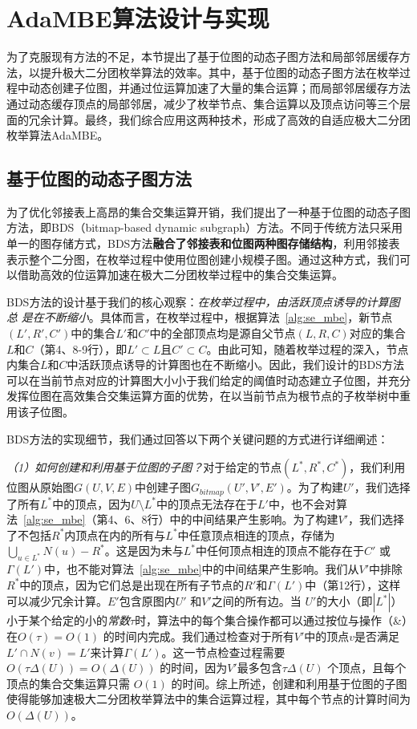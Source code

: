 \section{AdaMBE算法设计与实现}

为了克服现有方法的不足，本节提出了基于位图的动态子图方法和局部邻居缓存方法，以提升极大二分团枚举算法的效率。其中，基于位图的动态子图方法在枚举过程中动态创建子位图，并通过位运算加速了大量的集合运算；而局部邻居缓存方法通过动态缓存顶点的局部邻居，减少了枚举节点、集合运算以及顶点访问等三个层面的冗余计算。最终，我们综合应用这两种技术，形成了高效的自适应极大二分团枚举算法AdaMBE。

\subsection{基于位图的动态子图方法}
\label{subsec:ada_design_1}

为了优化邻接表上高昂的集合交集运算开销，我们提出了一种基于位图的动态子图方法，即BDS（bitmap-based dynamic subgraph）方法。不同于传统方法只采用单一的图存储方式，BDS方法\textbf{融合了邻接表和位图两种图存储结构}，利用邻接表表示整个二分图，在枚举过程中使用位图创建小规模子图。通过这种方式，我们可以借助高效的位运算加速在极大二分团枚举过程中的集合交集运算。

BDS方法的设计基于我们的核心观察：\emph{在枚举过程中，由活跃顶点诱导的计算图总} \emph{是在不断缩小}。具体而言，在枚举过程中，根据算法~\ref{alg:se_mbe}，新节点$(L',R',C')$中的集合$L'$和$C'$中的全部顶点均是源自父节点$(L, R, C)$对应的集合$L$和$C$（第4、8-9行），即$L'\subset L$且$C'\subset C$。由此可知，随着枚举过程的深入，节点内集合$L$和$C$中活跃顶点诱导的计算图也在不断缩小。因此，我们设计的BDS方法可以在当前节点对应的计算图大小小于我们给定的阈值时动态建立子位图，并充分发挥位图在高效集合交集运算方面的优势，在以当前节点为根节点的子枚举树中重用该子位图。

BDS方法的实现细节，我们通过回答以下两个关键问题的方式进行详细阐述：

\textit{（1）如何创建和利用基于位图的子图？}对于给定的节点$(L^*, R^*, C^*)$，我们利用位图从原始图$G(U, V, E)$中创建子图$G_{bitmap}(U',V',E')$。为了构建$U'$，我们选择了所有$L^*$中的顶点，因为$U \setminus L^*$中的顶点无法存在于$L'$中，也不会对算法~\ref{alg:se_mbe}（第4、6、8行）中的中间结果产生影响。为了构建$V'$，我们选择了不包括$R^*$内顶点在内的所有与$L^*$中任意顶点相连的顶点，存储为$\bigcup_{u \in L^*}N(u) - R^*$。这是因为未与$L^*$中任何顶点相连的顶点不能存在于$C'$ 或 $\Gamma(L')$中，也不能对算法~\ref{alg:se_mbe}中的中间结果产生影响。我们从$V'$中排除$R^*$中的顶点，因为它们总是出现在所有子节点的$R'$和$\Gamma(L')$中（第12行），这样可以减少冗余计算。$E'$包含原图内$U'$ 和$V'$之间的所有边。当 $U'$的大小（即$|L^*|$）小于某个给定的小的\emph{常数$\tau$}时，算法中的每个集合操作都可以通过按位与操作（\&）在$O(\tau) = O(1)$ 的时间内完成。我们通过检查对于所有$V'$中的顶点$v$是否满足$L' \cap N(v) = L'$来计算$\Gamma(L')$。这一节点检查过程需要$O(\tau \Delta(U))=O(\Delta(U))$ 的时间，因为$V'$最多包含$\tau \Delta(U)$ 个顶点，且每个顶点的集合交集运算只需 $O(1)$ 的时间。综上所述，创建和利用基于位图的子图使得能够加速极大二分团枚举算法中的集合运算过程，其中每个节点的计算时间为$O(\Delta(U))$。

